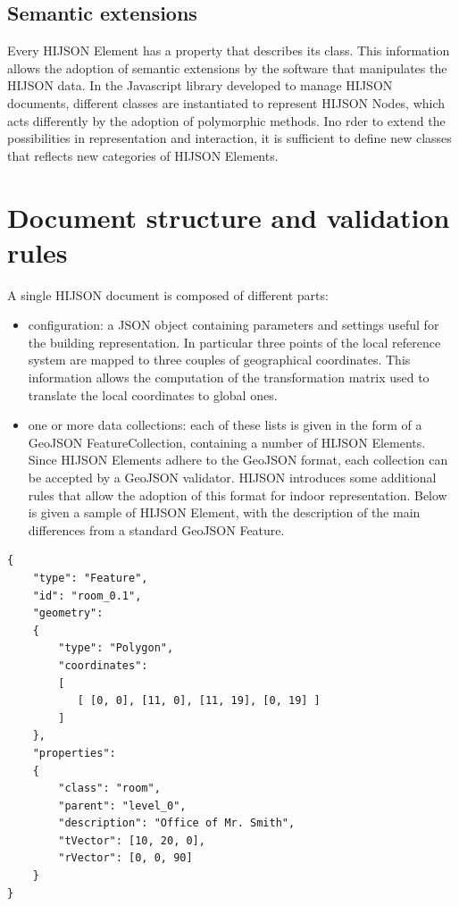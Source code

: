 \documentclass{sig-alternate}
\begin{document}
\subsection{Semantic extensions}\label{semantic-extensions}

Every HIJSON Element has a property that describes its class. This information allows the adoption of semantic extensions by the software that manipulates the HIJSON data. In the Javascript library developed to manage HIJSON documents, different classes are instantiated to represent HIJSON Nodes, which acts differently by the adoption of polymorphic methods. Ino rder to extend the possibilities in representation and interaction, it is sufficient to define new classes that reflects new categories of HIJSON Elements.

\section{Document structure and validation rules}\label{document-structure-and-validation-rules}

A single HIJSON document is composed of different parts:

\begin{itemize}
\itemsep1pt\parskip0pt
\item
  configuration: a JSON object containing parameters and settings useful
  for the building representation. In particular three points of the
  local reference system are mapped to three couples of geographical
  coordinates. This information allows the computation of the
  transformation matrix used to translate the local coordinates to
  global ones.
\item
  one or more data collections: each of these lists is given in the form
  of a GeoJSON FeatureCollection, containing a number of HIJSON
  Elements. Since HIJSON Elements adhere to the GeoJSON format, each
  collection can be accepted by a GeoJSON validator. HIJSON introduces
  some additional rules that allow the adoption of this format for
  indoor representation. Below is given a sample of HIJSON Element, with
  the description of the main differences from a standard GeoJSON
  Feature.
\end{itemize}

\begin{verbatim}
{
    "type": "Feature",
    "id": "room_0.1",
    "geometry": 
    {
        "type": "Polygon",
        "coordinates": 
        [ 
           [ [0, 0], [11, 0], [11, 19], [0, 19] ]
        ]    
    },
    "properties": 
    {
        "class": "room",
        "parent": "level_0",
        "description": "Office of Mr. Smith",
        "tVector": [10, 20, 0],
        "rVector": [0, 0, 90]
    }
}
\end{verbatim}
\end{document}
